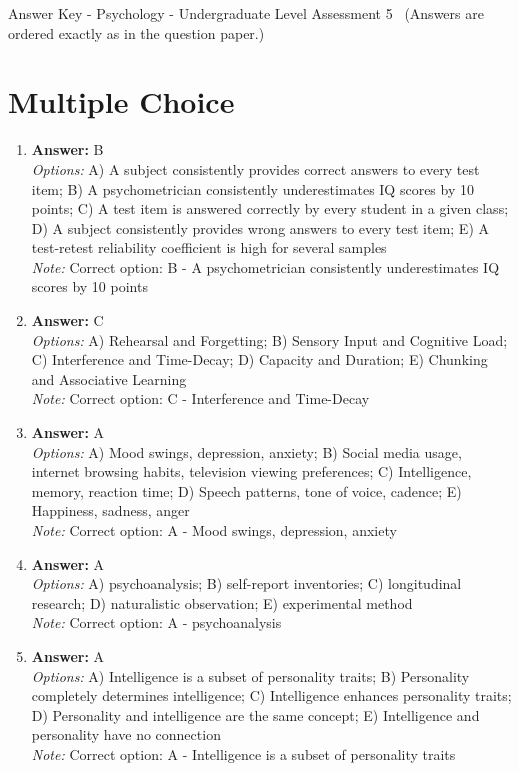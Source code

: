 \documentclass[12pt]{article}
\begin{document}
\begin{center}
Answer Key - Psychology - Undergraduate Level Assessment 5 \
\small (Answers are ordered exactly as in the question paper.)
\end{center}

\section*{Multiple Choice}
\begin{enumerate}[label=\arabic*.]
\item \textbf{Answer:} B
\\ \textit{Options:} A) A subject consistently provides correct answers to every test item; B) A psychometrician consistently underestimates IQ scores by 10 points; C) A test item is answered correctly by every student in a given class; D) A subject consistently provides wrong answers to every test item; E) A test-retest reliability coefficient is high for several samples
\\ \textit{Note:} Correct option: B - A psychometrician consistently underestimates IQ scores by 10 points
\item \textbf{Answer:} C
\\ \textit{Options:} A) Rehearsal and Forgetting; B) Sensory Input and Cognitive Load; C) Interference and Time-Decay; D) Capacity and Duration; E) Chunking and Associative Learning
\\ \textit{Note:} Correct option: C - Interference and Time-Decay
\item \textbf{Answer:} A
\\ \textit{Options:} A) Mood swings, depression, anxiety; B) Social media usage, internet browsing habits, television viewing preferences; C) Intelligence, memory, reaction time; D) Speech patterns, tone of voice, cadence; E) Happiness, sadness, anger
\\ \textit{Note:} Correct option: A - Mood swings, depression, anxiety
\item \textbf{Answer:} A
\\ \textit{Options:} A) psychoanalysis; B) self-report inventories; C) longitudinal research; D) naturalistic observation; E) experimental method
\\ \textit{Note:} Correct option: A - psychoanalysis
\item \textbf{Answer:} A
\\ \textit{Options:} A) Intelligence is a subset of personality traits; B) Personality completely determines intelligence; C) Intelligence enhances personality traits; D) Personality and intelligence are the same concept; E) Intelligence and personality have no connection
\\ \textit{Note:} Correct option: A - Intelligence is a subset of personality traits
\end{enumerate}
\end{document}
